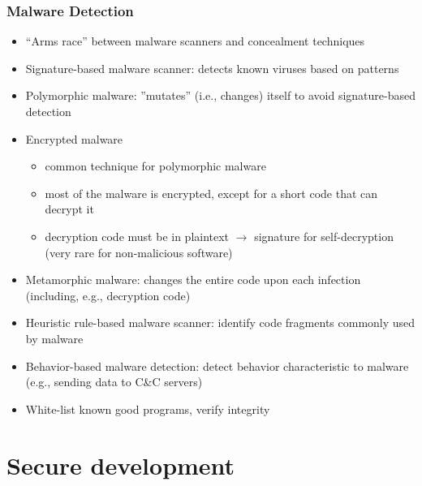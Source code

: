 \documentclass[final]{article}
\begin{document}
\subsubsection*{Malware Detection}
\begin{itemize}[nosep]
    \item ``Arms race'' between malware scanners and concealment techniques
    \item Signature-based malware scanner: detects known viruses based on patterns
    \item Polymorphic malware: ''mutates'' (i.e., changes) itself to avoid signature-based detection
    \item Encrypted malware
          \begin{itemize}[nosep]
              \item common technique for polymorphic malware
              \item most of the malware is encrypted, except for a short code that can decrypt it
              \item decryption code must be in plaintext $\rightarrow$ signature for self-decryption (very rare for non-malicious software)
          \end{itemize}
    \item Metamorphic malware: changes the entire code upon each infection (including, e.g., decryption code)
    \item Heuristic rule-based malware scanner: identify code fragments commonly used by malware
    \item Behavior-based malware detection: detect behavior characteristic to malware (e.g., sending data to C\&C servers)
    \item White-list known good programs, verify integrity
\end{itemize}
\section{Secure development}
\end{document}

